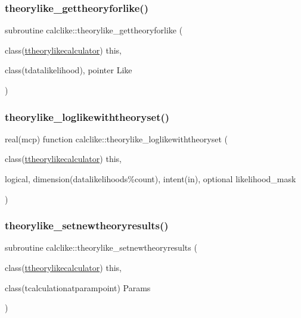 \subsubsection{\texorpdfstring{theorylike\+\_\+gettheoryforlike()}{theorylike\_gettheoryforlike()}}
{\footnotesize\ttfamily subroutine calclike\+::theorylike\+\_\+gettheoryforlike (\begin{DoxyParamCaption}\item[{class(\mbox{\hyperlink{structcalclike_1_1ttheorylikecalculator}{ttheorylikecalculator}})}]{this,  }\item[{class(tdatalikelihood), pointer}]{Like }\end{DoxyParamCaption})\hspace{0.3cm}{\ttfamily [private]}}

\mbox{\label{namespacecalclike_a81e2854f62abdf354c1f03fc29c05d1c}} 
\subsubsection{\texorpdfstring{theorylike\+\_\+loglikewiththeoryset()}{theorylike\_loglikewiththeoryset()}}
{\footnotesize\ttfamily real(mcp) function calclike\+::theorylike\+\_\+loglikewiththeoryset (\begin{DoxyParamCaption}\item[{class(\mbox{\hyperlink{structcalclike_1_1ttheorylikecalculator}{ttheorylikecalculator}})}]{this,  }\item[{logical, dimension(datalikelihoods\%count), intent(in), optional}]{likelihood\+\_\+mask }\end{DoxyParamCaption})\hspace{0.3cm}{\ttfamily [private]}}

\mbox{\label{namespacecalclike_a3823367d787d17f15e903222232f4b94}} 
\subsubsection{\texorpdfstring{theorylike\+\_\+setnewtheoryresults()}{theorylike\_setnewtheoryresults()}}
{\footnotesize\ttfamily subroutine calclike\+::theorylike\+\_\+setnewtheoryresults (\begin{DoxyParamCaption}\item[{class(\mbox{\hyperlink{structcalclike_1_1ttheorylikecalculator}{ttheorylikecalculator}})}]{this,  }\item[{class(tcalculationatparampoint)}]{Params }\end{DoxyParamCaption})\hspace{0.3cm}{\ttfamily [private]}}

